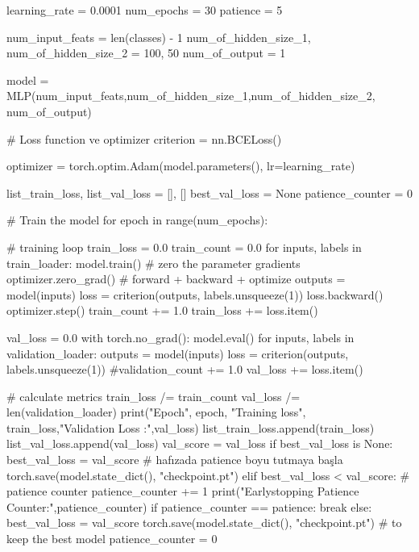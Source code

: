 \documentclass[11pt]{article}
\begin{document}
\begin{python}
learning_rate = 0.0001
num_epochs = 30
patience = 5

num_input_feats = len(classes) - 1
num_of_hidden_size_1, num_of_hidden_size_2 = 100, 50
num_of_output = 1

model = MLP(num_input_feats,num_of_hidden_size_1,num_of_hidden_size_2, num_of_output)

# Loss function ve optimizer
criterion = nn.BCELoss()

optimizer = torch.optim.Adam(model.parameters(), lr=learning_rate)

list_train_loss, list_val_loss = [], []
best_val_loss = None
patience_counter = 0

# Train the model
for epoch in range(num_epochs):

    # training loop
    train_loss = 0.0
    train_count = 0.0
    for inputs, labels in train_loader:
        model.train()
        # zero the parameter gradients
        optimizer.zero_grad()
        # forward + backward + optimize
        outputs = model(inputs)
        loss = criterion(outputs, labels.unsqueeze(1))
        loss.backward()
        optimizer.step()
        train_count += 1.0
        train_loss += loss.item()
     
    val_loss = 0.0
    with torch.no_grad():
        model.eval()
        for inputs, labels in validation_loader:
            outputs = model(inputs)
            loss = criterion(outputs, labels.unsqueeze(1))
            #validation_count += 1.0
            val_loss += loss.item()
  
    # calculate metrics
    train_loss /= train_count
    val_loss /= len(validation_loader)
    print("Epoch", epoch, "Training loss", train_loss,"Validation Loss :",val_loss)
    list_train_loss.append(train_loss)
    list_val_loss.append(val_loss)
    val_score = val_loss
    if best_val_loss is None:
        best_val_loss = val_score # hafızada patience boyu tutmaya başla
        torch.save(model.state_dict(), "checkpoint.pt")
    elif best_val_loss < val_score: # patience counter
        patience_counter += 1
        print("Earlystopping Patience Counter:",patience_counter)
        if patience_counter == patience:
            break
    else:
        best_val_loss = val_score
        torch.save(model.state_dict(), "checkpoint.pt") # to keep the best model
        patience_counter = 0
\end{python}

\end{document}
